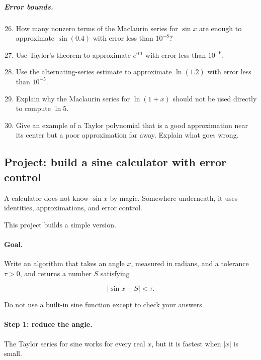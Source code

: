 \subparagraph{Error bounds.}
\begin{enumerate}
\setcounter{enumi}{25}

\item How many nonzero terms of the Maclaurin series for \(\sin x\) are enough to
approximate \(\sin(0.4)\) with error less than \(10^{-8}\)?

\item Use Taylor's theorem to approximate \(e^{0.1}\) with error less than \(10^{-6}\).

\item Use the alternating-series estimate to approximate \(\ln(1.2)\) with error less than
\(10^{-5}\).

\item Explain why the Maclaurin series for \(\ln(1+x)\) should not be used directly to
compute \(\ln 5\).

\item Give an example of a Taylor polynomial that is a good approximation near its center
but a poor approximation far away.  Explain what goes wrong.
\end{enumerate}

\subsection{Project: build a sine calculator with error control}
\label{subsec:project-sine-calculator}

A calculator does not know \(\sin x\) by magic.  Somewhere underneath, it uses identities,
approximations, and error control.

This project builds a simple version.

\paragraph{Goal.}
Write an algorithm that takes an angle \(x\), measured in radians, and a tolerance
\(\tau>0\), and returns a number \(S\) satisfying

\[
|\sin x-S|<\tau.
\]

Do not use a built-in sine function except to check your answers.

\paragraph{Step 1: reduce the angle.}
The Taylor series for sine works for every real \(x\), but it is fastest when \(|x|\) is small.

